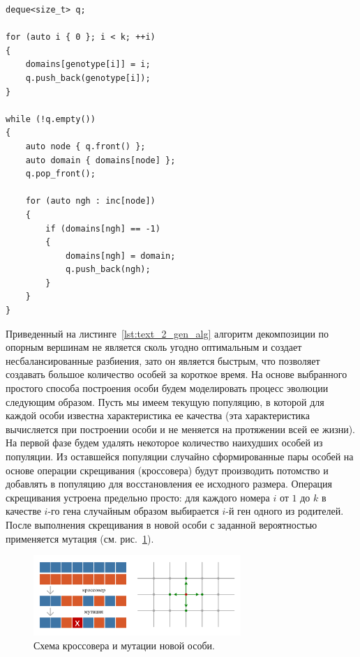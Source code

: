 \begin{singlespace}
\begin{lstlisting}[caption={Простая декомпозиция, используемая в генетическом алгоритме.},label={lst:text_2_gen_alg}]
deque<size_t> q;

for (auto i { 0 }; i < k; ++i)
{
    domains[genotype[i]] = i;
    q.push_back(genotype[i]);
}

while (!q.empty())
{
    auto node { q.front() };
    auto domain { domains[node] };
    q.pop_front();

    for (auto ngh : inc[node])
    {
        if (domains[ngh] == -1)
        {
            domains[ngh] = domain;
            q.push_back(ngh);
        }
    }
}
\end{lstlisting}
\end{singlespace}

Приведенный на листинге~\ref{lst:text_2_gen_alg} алгоритм декомпозиции по опорным вершинам не является сколь угодно оптимальным и создает несбалансированные разбиения, зато он является быстрым, что позволяет создавать большое количество особей за короткое время.
На основе выбранного простого способа построения особи будем моделировать процесс эволюции следующим образом.
Пусть мы имеем текущую популяцию, в которой для каждой особи известна характеристика ее качества (эта характеристика вычисляется при построении особи и не меняется на протяжении всей ее жизни).
На первой фазе будем удалять некоторое количество наихудших особей из популяции.
Из оставшейся популяции случайно сформированные пары особей на основе операции скрещивания (кроссовера) будут производить потомство и добавлять в популяцию для восстановления ее исходного размера.
Операция скрещивания устроена предельно просто: для каждого номера $i$ от $1$ до $k$ в качестве $i$-го гена случайным образом выбирается $i$-й ген одного из родителей.
После выполнения скрещивания в новой особи с заданной вероятностью применяется мутация (см. рис.~\ref{fig:text_2_genetic_cross_mut}).

\begin{figure}[ht]
\centering
\includegraphics[width=0.7\textwidth]{fig/par_gen_cross-mut.pdf}
\singlespacing
{}\caption{Схема кроссовера и мутации новой особи.}
\label{fig:text_2_genetic_cross_mut}
\end{figure}

